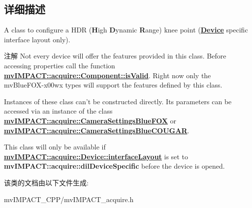 \subsection{详细描述}
A class to configure a H\+D\+R ({\bfseries H}igh {\bfseries D}ynamic {\bfseries R}ange) knee point ({\bfseries \hyperlink{classmv_i_m_p_a_c_t_1_1acquire_1_1_device}{Device}} specific interface layout only). 

\begin{DoxyNote}{注解}
Not every device will offer the features provided in this class. Before accessing properties call the function {\bfseries \hyperlink{classmv_i_m_p_a_c_t_1_1acquire_1_1_component_ac51e55e7e046101f3c6119d84123abd5}{mv\+I\+M\+P\+A\+C\+T\+::acquire\+::\+Component\+::is\+Valid}}. Right now only the mv\+Blue\+F\+O\+X-\/x00wx types will support the features defined by this class.

Instances of these class can't be constructed directly. Its parameters can be accessed via an instance of the class {\bfseries \hyperlink{classmv_i_m_p_a_c_t_1_1acquire_1_1_camera_settings_blue_f_o_x}{mv\+I\+M\+P\+A\+C\+T\+::acquire\+::\+Camera\+Settings\+Blue\+F\+O\+X}} or {\bfseries \hyperlink{classmv_i_m_p_a_c_t_1_1acquire_1_1_camera_settings_blue_c_o_u_g_a_r}{mv\+I\+M\+P\+A\+C\+T\+::acquire\+::\+Camera\+Settings\+Blue\+C\+O\+U\+G\+A\+R}}.

This class will only be available if {\bfseries \hyperlink{classmv_i_m_p_a_c_t_1_1acquire_1_1_device_ab4dd0ecc9d456bb5ddc01d844c9d6f2d}{mv\+I\+M\+P\+A\+C\+T\+::acquire\+::\+Device\+::interface\+Layout}} is set to {\bfseries mv\+I\+M\+P\+A\+C\+T\+::acquire\+::dil\+Device\+Specific} before the device is opened. 
\end{DoxyNote}


该类的文档由以下文件生成\+:\begin{DoxyCompactItemize}
\item 
mv\+I\+M\+P\+A\+C\+T\+\_\+\+C\+P\+P/mv\+I\+M\+P\+A\+C\+T\+\_\+acquire.\+h\end{DoxyCompactItemize}
